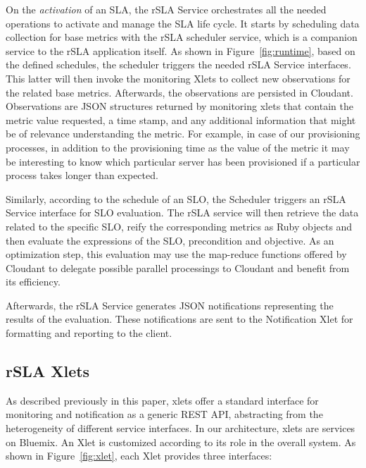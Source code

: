 On the {\em activation} of an SLA, the rSLA Service orchestrates all the needed operations to activate and manage the SLA life cycle. It starts by scheduling data collection for base 
metrics with the rSLA scheduler service, which is a companion service to the rSLA application itself. As shown in Figure~\ref{fig:runtime}, based on the defined schedules, the scheduler triggers the needed rSLA Service interfaces. This latter will then invoke the 
monitoring Xlets to collect new observations for the related base metrics. Afterwards, the observations are persisted in Cloudant. Observations are  JSON structures returned by monitoring xlets that contain the metric value requested, a time stamp, and any additional information that might be of relevance understanding the metric. For example, in case of our provisioning processes, in addition to the provisioning time as the value of the metric it may be interesting to know which particular server has been provisioned if a particular process takes longer than expected.

Similarly, according to the schedule of an SLO, the 
Scheduler triggers an rSLA Service interface for SLO evaluation. The rSLA service will then retrieve the data related to the specific SLO, reify the corresponding metrics as Ruby objects and then evaluate the expressions of the SLO, precondition and objective. As an optimization step, this evaluation may use the  map-reduce functions offered by Cloudant to delegate  possible parallel processings to Cloudant and benefit from its efficiency.

Afterwards, the rSLA Service generates JSON notifications representing the results of the evaluation. These notifications are sent to the Notification Xlet for formatting and reporting to the client.   

\subsection{rSLA Xlets}

As described previously in this paper, xlets offer a standard interface for monitoring and notification as a generic REST API, abstracting from the heterogeneity of different service interfaces. In our architecture, xlets are services on Bluemix.
 An Xlet is customized according to its role in the overall system. As shown in Figure~\ref{fig:xlet}, each Xlet provides three 
interfaces:

